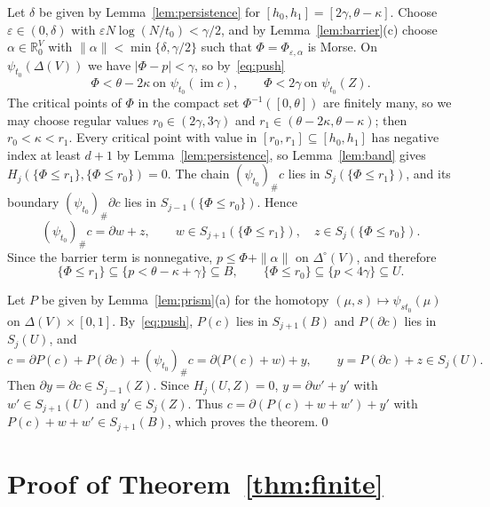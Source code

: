 \documentclass[11pt]{article}
\theoremstyle{definition}
\numberwithin{equation}{section}
\newcommand{\R}{\mathbb R}
\DeclareMathOperator{\im}{im}
\begin{document}
Let $\delta$ be given by Lemma~\ref{lem:persistence} for $[h_0,h_1]=[2\gamma,\theta-\kappa]$. Choose $\varepsilon\in(0,\delta)$ with $\varepsilon N\log(N/t_0)<\gamma/2$, and by Lemma~\ref{lem:barrier}(c) choose $\alpha\in\R^V_0$ with $\|\alpha\|<\min\{\delta,\gamma/2\}$ such that $\Phi=\Phi_{\varepsilon,\alpha}$ is Morse. On $\psi_{t_0}(\Delta(V))$ we have $|\Phi-p|<\gamma$, so by~\eqref{eq:push}
\begin{equation*}
 \Phi<\theta-2\kappa\ \text{on }\psi_{t_0}(\im c),\qquad\Phi<2\gamma\ \text{on }\psi_{t_0}(Z).
\end{equation*}
The critical points of $\Phi$ in the compact set $\Phi^{-1}([0,\theta])$ are finitely many, so we may choose regular values $r_0\in(2\gamma,3\gamma)$ and $r_1\in(\theta-2\kappa,\theta-\kappa)$; then $r_0<\kappa<r_1$. Every critical point with value in $[r_0,r_1]\subseteq[h_0,h_1]$ has negative index at least $d+1$ by Lemma~\ref{lem:persistence}, so Lemma~\ref{lem:band} gives $H_j(\{\Phi\le r_1\},\{\Phi\le r_0\})=0$. The chain $(\psi_{t_0})_\#c$ lies in $S_j(\{\Phi\le r_1\})$, and its boundary $(\psi_{t_0})_\#\partial c$ lies in $S_{j-1}(\{\Phi\le r_0\})$. Hence
\begin{equation*}
 (\psi_{t_0})_\#c=\partial w+z,\qquad w\in S_{j+1}(\{\Phi\le r_1\}),\quad z\in S_j(\{\Phi\le r_0\}).
\end{equation*}
Since the barrier term is nonnegative, $p\le\Phi+\|\alpha\|$ on $\Delta^\circ(V)$, and therefore
\begin{equation*}
 \{\Phi\le r_1\}\subseteq\{p<\theta-\kappa+\gamma\}\subseteq B,\qquad
 \{\Phi\le r_0\}\subseteq\{p<4\gamma\}\subseteq U.
\end{equation*}

Let $P$ be given by Lemma~\ref{lem:prism}(a) for the homotopy $(\mu,s)\mapsto\psi_{st_0}(\mu)$ on $\Delta(V)\times[0,1]$. By~\eqref{eq:push}, $P(c)$ lies in $S_{j+1}(B)$ and $P(\partial c)$ lies in $S_j(U)$, and
\begin{equation*}
 c=\partial P(c)+P(\partial c)+(\psi_{t_0})_\#c=\partial\bigl(P(c)+w\bigr)+y,\qquad y=P(\partial c)+z\in S_j(U).
\end{equation*}
Then $\partial y=\partial c\in S_{j-1}(Z)$. Since $H_j(U,Z)=0$, $y=\partial w'+y'$ with $w'\in S_{j+1}(U)$ and $y'\in S_j(Z)$. Thus $c=\partial(P(c)+w+w')+y'$ with $P(c)+w+w'\in S_{j+1}(B)$, which proves the theorem.\qed

\section{Proof of Theorem~\ref{thm:finite}}\label{sec:proof}
\end{document}

